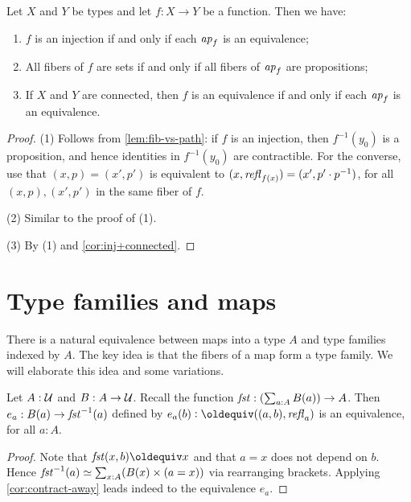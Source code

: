 \begin{definition}
\begin{corollary}\label{cor:fib-vs-path}
Let $X$ and $Y$ be types and let $f:X\to Y$ be a function. Then we have:
\begin{enumerate}
\item\label{prop-fib-vs-path} 
$f$ is an injection if and only if each $\mathop{{\it ap}_{f}}$ is an equivalence;
\item\label{set-fib-vs-path} 
All fibers of $f$ are sets if and only if all fibers of $\mathop{{\it ap}_{f}}$ are propositions;
\item\label{conn-fib-vs-path} 
If $X$ and $Y$ are connected, then $f$ is an equivalence 
if and only if each $\mathop{{\it ap}_{f}}$ is an equivalence.
\end{enumerate}
\end{corollary}
\begin{proof}
(1) Follows from \cref{lem:fib-vs-path}: if $f$ is an injection,
then $f^{-1}(y_0)$ is a proposition, and hence identities in $f^{-1}(y_0)$
are contractible. For the converse, use that $(x,p)=(x',p')$ is
equivalent to $(x,\mathop{{\it refl}_{f(x)}}) = (x',p'\cdot p^{-1})$, for all $(x,p),(x',p')$
in the same fiber of $f$.

(2) Similar to the proof of (1).

(3) By (1) and \cref{cor:inj+connected}.
\end{proof}


\section{Type families and maps}
\label{sec:typefam}

There is a natural equivalence between maps into a type $A$
and type families indexed by $A$. The key idea is that the
fibers of a map form a type family. We will elaborate this
idea and some variations.


\begin{lemma}\label{lem:fst-fiber(a)=B(a)}
Let $A:\mathcal{U}$ and $B:A\to\mathcal{U}$.
Recall the function $\mathop{\mathit{fst}}: (\sum_{a:A} B(a))\to A$.
Then $e_a: B(a) \to \mathop{\mathit{fst}}^{-1}(a)$ defined by 
$e_a(b)\defeq ((a,b),\refl{a})$ is an equivalence,
for all $a:A$.
\end{lemma}
\begin{proof}
Note that $\fst(x,b)\jdeq x$ and that $a=x$ does
not depend on $b$. Hence
$\mathop{\mathit{fst}}^{-1}(a) \simeq \sum_{x:A}  (B(x) \times (a=x))$
via rearranging brackets.
Applying \cref{cor:contract-away} leads indeed to 
the equivalence $e_a$. 
\end{proof}


\end{definition}
